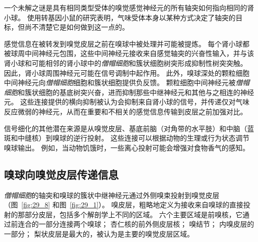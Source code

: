 一个未解之谜是具有相同类型受体的嗅觉感觉神经元的所有轴突如何指向相同的肾小球。
使用转基因小鼠的研究表明，气味受体本身以某种方式决定了轴突的目标，但尚不清楚它是如何做到这一点的。


感觉信息在被转发到嗅觉皮层之前在嗅球中被处理并可能被提炼。
每个肾小球都被球周中间神经元包围，这些中间神经元接收来自感觉轴突的兴奋性输入，并与该肾小球和可能相邻的肾小球中的\textit{僧帽细胞}和簇状细胞树突形成抑制性树突突触。
因此，肾小球周围神经元可能在信号调制中起作用。
此外，嗅球深处的颗粒细胞中间神经元向\textit{僧帽细胞}细胞和簇状细胞提供负反馈。
颗粒细胞中间神经元被\textit{僧帽细胞}和簇状细胞的基底树突兴奋，进而抑制那些中继神经元和其他与之相连的神经元。 
这些连接提供的横向抑制被认为会抑制来自肾小球的信号，并传递仅对气味反应微弱的神经元，从而在重要和不相关的感觉信息传输到皮层之前加强对比。


信号细化的其他潜在来源是从嗅觉皮层、基底前脑（对角带的水平肢）和中脑（蓝斑和中缝核）到嗅球的逆行投射。
这些连接可以根据动物的生理或行为状态调节嗅球输出。 
例如，当动物饥饿时，一些离心投射可能会增强对食物香气的感知。


\subsection{嗅球向嗅觉皮层传递信息}

\textit{僧帽细胞}的轴突和嗅球的簇状中继神经元通过外侧嗅束投射到嗅觉皮层（图~\ref{fig:29_8} 和图~\ref{fig:29_1}）。
嗅皮层，粗略地定义为接收来自嗅球的直接投射的那部分皮层，包括多个解剖学上不同的区域。
六个主要区域是前嗅核，它通过前连合的一部分连接两个嗅球；
杏仁核的前外侧皮层核；
嗅结节； 内嗅皮层的一部分；
梨状皮层是最大的，被认为是主要的嗅觉皮层区域。


